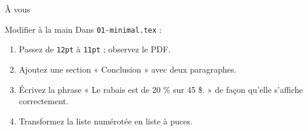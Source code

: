 \begin{frame}{À vous}
  \begin{Exercice}{Modifier à la main}
    \small Dans \texttt{01-minimal.tex} :
    \begin{enumerate}
      \item Passez de \texttt{12pt} à \texttt{11pt} ; observez le PDF.
      \item Ajoutez une section « Conclusion » avec deux paragraphes.
      \item Écrivez la phrase « Le rabais est de 20 \% sur 45 \$. » de
        façon qu'elle s'affiche correctement.
      \item Transformez la liste numérotée en liste à puces.
    \end{enumerate}
  \end{Exercice}
\end{frame}
